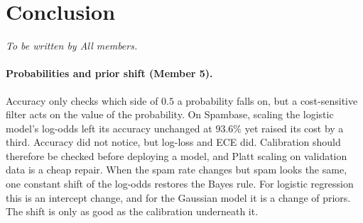 \section{Conclusion}
\label{sec:conclusion}
\emph{To be written by All members.}

\paragraph{Probabilities and prior shift (Member 5).}
Accuracy only checks which side of $0.5$ a probability falls on, but a cost-sensitive filter acts on the
value of the probability. On Spambase, scaling the logistic model's log-odds left its accuracy unchanged at
$93.6\%$ yet raised its cost by a third. Accuracy did not notice, but log-loss and ECE did.
Calibration should therefore be checked before deploying a model, and Platt scaling on validation data is
a cheap repair. When the spam rate changes but spam looks the same, one constant shift of the log-odds
restores the Bayes rule. For logistic regression this is an intercept change, and for the Gaussian model it
is a change of priors. The shift is only as good as the calibration underneath it.
